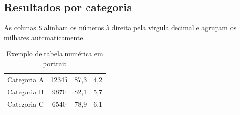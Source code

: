 \documentclass[a4paper, 11pt]{DPQISTfactsheet}
\begin{document}

\subsection{Resultados por categoria}

As colunas \verb|S| alinham os números à direita pela vírgula decimal e
agrupam os milhares automaticamente.

\begin{table}[htbp]
    \centering
    \caption{Exemplo de tabela numérica em portrait}
    \label{tab:portrait}
    \begin{tabular}{L{4cm} S[table-format=5.0] S[table-format=2.1] S[table-format=2.1]}
        \toprule
        {} & {} & {} & {} \\
        \midrule
        Categoria A & 12345 & 87,3 & 4,2 \\
        Categoria B & 9870  & 82,1 & 5,7 \\
        Categoria C & 6540  & 78,9 & 6,1 \\
        \bottomrule
    \end{tabular}
\end{table}


\newpage
\end{document}
